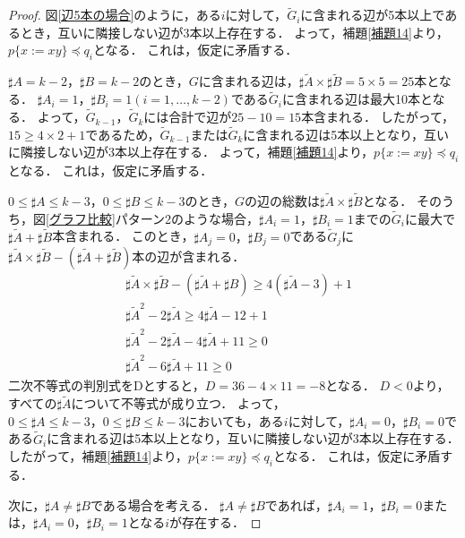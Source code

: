 \begin{proof}
図\ref{辺5本の場合}のように，ある$i$に対して，$\tilde{G}_{i}$に含まれる辺が5本以上であるとき，互いに隣接しない辺が3本以上存在する．
よって，補題\ref{補題14}より，$p \{x:=xy \} \preceq q_{i}$となる．
これは，仮定に矛盾する．

$\sharp A=k-2，\sharp B=k-2$のとき，$G$に含まれる辺は，$\sharp\tilde{A} \times \sharp\tilde{B}=5 \times 5=25$本となる．
$\sharp A_{i}=1，\sharp B_{i}=1 (i=1, \ldots , k-2)$である$\tilde{G}_{i}$に含まれる辺は最大10本となる．
よって，$\tilde{G}_{k-1}，\tilde{G}_{k}$には合計で辺が$25-10=15$本含まれる．
したがって，$15 \ge 4 \times 2 + 1$であるため，$\tilde{G}_{k-1}$または$\tilde{G}_{k}$に含まれる辺は5本以上となり，互いに隣接しない辺が3本以上存在する．
よって，補題\ref{補題14}より，$p \{x:=xy \} \preceq q_{i}$となる．
これは，仮定に矛盾する．

$0 \le \sharp A \le k-3，0 \le \sharp B \le k-3$のとき，$G$の辺の総数は$\sharp\tilde{A} \times \sharp\tilde{B}$となる．
そのうち，図\ref{グラフ比較}パターン2のような場合，$\sharp A_{i}=1，\sharp B_{i}=1$までの$\tilde{G}_{i}$に最大で$\sharp\tilde{A}+\sharp\tilde{B}$本含まれる．
このとき，$\sharp A_{j}=0，\sharp B_{j}=0$である$\tilde{G}_{j}$に$\sharp\tilde{A} \times \sharp\tilde{B} - (\sharp\tilde{A} + \sharp\tilde{B})$本の辺が含まれる．
\begin{align*}
&\sharp\tilde{A} \times \sharp\tilde{B} -(\sharp\tilde{A}+\sharp{B}) \ge 4(\sharp\tilde{A}-3)+1\\
&\sharp\tilde{A}^{2}-2\sharp\tilde{A} \ge 4\sharp\tilde{A}-12+1\\
&\sharp\tilde{A}^{2}-2\sharp\tilde{A}-4\sharp\tilde{A}+11 \ge 0\\
&\sharp\tilde{A}^{2}-6\sharp\tilde{A}+11 \ge 0
\end{align*}
二次不等式の判別式をDとすると，$D=36-4\times11=-8$となる．
$D<0$より，すべての$\sharp\tilde{A}$について不等式が成り立つ．
よって，$0 \le \sharp A \le k-3，0 \le \sharp B \le k-3$においても，ある$i$に対して，$\sharp A_{i}=0，\sharp B_{i}=0$である$\tilde{G}_{i}$に含まれる辺は5本以上となり，互いに隣接しない辺が3本以上存在する．
したがって，補題\ref{補題14}より，$p \{x:=xy \} \preceq q_{i}$となる．
これは，仮定に矛盾する．

次に，$\sharp A \not = \sharp B$である場合を考える．
$\sharp A \not = \sharp B$であれば，$\sharp A_{i}=1，\sharp B_{i}=0$または，$\sharp A_{i} =0，\sharp B_{i}=1$となる$i$が存在する．


\end{proof}
